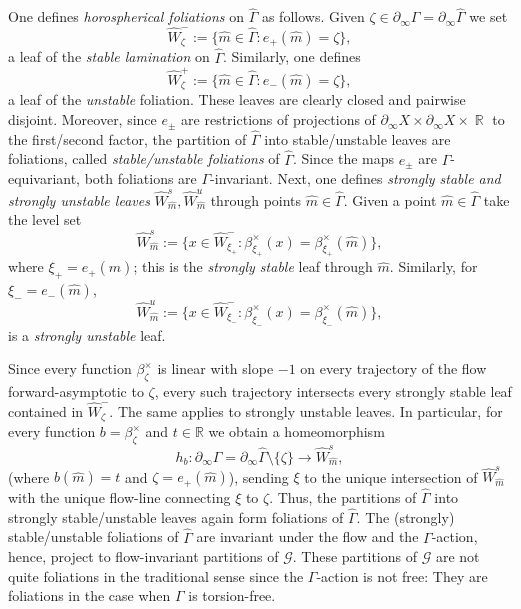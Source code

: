 \documentclass[12pt]{amsbook}%
\theoremstyle{definition}
\theoremstyle{remark}
\numberwithin{section}{chapter}
\numberwithin{subsection}{section}
\numberwithin{figure}{chapter}
\DeclareMathOperator{\R}{\mathbb{R}}
\def\Ga{\Gamma}
\def\geo{\partial_\infty}
\def\cG{{\mathscr{G}}}
\def\kap{}
\begin{document}
One defines {\em horospherical foliations} on $\widehat\Ga$ as follows. 
Given $\zeta\in \geo \Ga=\geo \widehat\Ga$ we set
$$
\widehat{W}^-_\zeta:= \{\hat m\in \widehat\Ga: e_+(\hat m)=\zeta\}, 
$$
a leaf of the {\em stable lamination} on $\widehat\Ga$. Similarly,  one defines 
$$
\widehat W^+_\zeta:= \{\hat m\in \widehat\Ga: e_-(\hat m)=\zeta\}, 
$$
a leaf of the {\em unstable} foliation. These leaves are clearly closed and pairwise disjoint. Moreover, since $e_\pm$ are restrictions 
of projections of $\geo X \times \geo X\times \R$ to the first/second factor, the partition of $\widehat\Ga$ into stable/unstable leaves are foliations, called 
{\em stable/unstable foliations} of $\widehat\Ga$. Since the maps $e_\pm$ are $\Ga$-equivariant, both foliations are $\Ga$-invariant. 
Next, one defines {\em strongly stable and strongly unstable leaves} $\widehat W^{s}_{\hat m}, \widehat W^{u}_{\hat m}$ through 
points $\hat m\in \widehat\Ga$. Given a point $\hat m\in \widehat\Ga$ take the level set 
$$
\widehat W^{s}_{\hat m}:=\{x\in \widehat{W}^-_{\xi_+}: \beta^\times_{\xi_+}(x)=\beta^\times_{\xi_+}(\hat m)\},
$$
where $\xi_+=e_+(\hat m)$; this is the  
 {\em strongly stable} leaf through $\hat m$. Similarly, for $\xi_-=e_-(\hat m)$, 
$$
\widehat W^{u}_{\hat m}:=\{x\in \widehat{W}^-_{\xi_-}: \beta^\times_{\xi_-}(x)=\beta^\times_{\xi_-}(\hat m)\},
$$
is a {\em strongly unstable}  leaf. %


Since every function $\beta^\times_\zeta$ is linear with slope $-1$ on every trajectory of the flow 
forward-asymptotic to $\zeta$, every such trajectory intersects every strongly stable leaf contained in $\widehat W^-_\zeta$. 
The same applies to strongly unstable leaves. In particular, for every function $b=\beta^\times_\zeta$ and $t\in \mathbb R$ we obtain a homeomorphism
\begin{equation}\label{eq:bdry-to-horosphere}
h_b: \geo \Ga=\geo \widehat \Ga\setminus \{\zeta\} \to \widehat W^{s}_{\hat m},
\end{equation}
(where $b(\hat m)=t$ and $\zeta=e_+(\hat m)$), sending $\xi$ to the unique intersection of $\widehat W^{s}_{\hat m}$ with the unique flow-line connecting 
$\xi$ to $\zeta$.  Thus, the partitions of $\widehat\Ga$ into strongly stable/unstable leaves again form foliations of $\widehat\Ga$. 
The (strongly) stable/unstable foliations of $\widehat \Ga$ are invariant under the 
flow and the $\Ga$-action, hence, project to flow-invariant partitions of $\cG$. These partitions of $\cG$ 
are not quite foliations in the traditional sense since the $\Ga$-action is not free: They are foliations in the case when $\Ga$ is torsion-free.  
\end{document}
